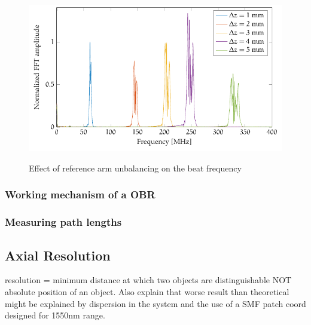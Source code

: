 \begin{figure}[hbt]
{\myfloatalign
\includegraphics[width=\linewidth]{gfx/tikz/balancing/unbalanced}}
\caption{Effect of reference arm unbalancing on the beat frequency}\label{fig:unbalanced-spectrum}
\end{figure}
\subsubsection{Working mechanism of a OBR}

\subsubsection{Measuring path lengths}



\subsection{Axial Resolution}
resolution = minimum distance at which two objects are distinguishable NOT absolute position of an object. Also explain that worse result than theoretical might be explained by dispersion in the system and the use of a SMF patch coord designed for 1550nm range.

